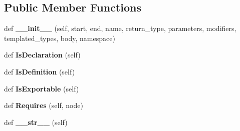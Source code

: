 \subsection*{Public Member Functions}
\begin{DoxyCompactItemize}
\item 
def {\bfseries \+\_\+\+\_\+init\+\_\+\+\_\+} (self, start, end, name, return\+\_\+type, parameters, modifiers, templated\+\_\+types, body, namespace)\hypertarget{classcpp_1_1ast_1_1Function_ab5270f5d353ec5e9dcd136e4cc6c7f6c}{}\label{classcpp_1_1ast_1_1Function_ab5270f5d353ec5e9dcd136e4cc6c7f6c}

\item 
def {\bfseries Is\+Declaration} (self)\hypertarget{classcpp_1_1ast_1_1Function_ab9120d9a774eb5860d220b3bcdcaa87e}{}\label{classcpp_1_1ast_1_1Function_ab9120d9a774eb5860d220b3bcdcaa87e}

\item 
def {\bfseries Is\+Definition} (self)\hypertarget{classcpp_1_1ast_1_1Function_ad5d96144bd8418ac72332bffb21ea86f}{}\label{classcpp_1_1ast_1_1Function_ad5d96144bd8418ac72332bffb21ea86f}

\item 
def {\bfseries Is\+Exportable} (self)\hypertarget{classcpp_1_1ast_1_1Function_a85a073cd69116bc6191f379d69d10d72}{}\label{classcpp_1_1ast_1_1Function_a85a073cd69116bc6191f379d69d10d72}

\item 
def {\bfseries Requires} (self, node)\hypertarget{classcpp_1_1ast_1_1Function_a999e7b5e43517cd4d68b1aeea8a7d6e1}{}\label{classcpp_1_1ast_1_1Function_a999e7b5e43517cd4d68b1aeea8a7d6e1}

\item 
def {\bfseries \+\_\+\+\_\+str\+\_\+\+\_\+} (self)\hypertarget{classcpp_1_1ast_1_1Function_aaef91d6a3b1eb2703eebb32d39c45978}{}\label{classcpp_1_1ast_1_1Function_aaef91d6a3b1eb2703eebb32d39c45978}

\end{DoxyCompactItemize}
